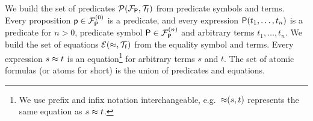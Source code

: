 
\begin{definition}\label{def:predicates}
	We build the set of {\myem predicates} $\mcPT$
	from predicate symbols and terms. 
	Every proposition $\mpp\in \mcFPn[0]$ is a predicate, 
	and every expression $\mP(t_1,\ldots,t_n)$ is a predicate for $n>0$,
	predicate symbol $\mP\in\mcFPn$ and arbitrary terms $t_1,\ldots,t_n$.
%	
	We build the set of {\myem equations }$\mcET$ from the equality symbol and terms.
	Every expression $s\mEQ t$ is an equation\footnote{
		We use prefix and infix notation interchangeable, 
		e.g.~${\mEQ}(s,t)$ represents the same equation as $s\mEQ t$.} 
	for arbitrary terms $s$ and $t$.
%	
	The set of atomic formulas (or {\myem atoms }for short) is the union of predicates and equations.
\end{definition}